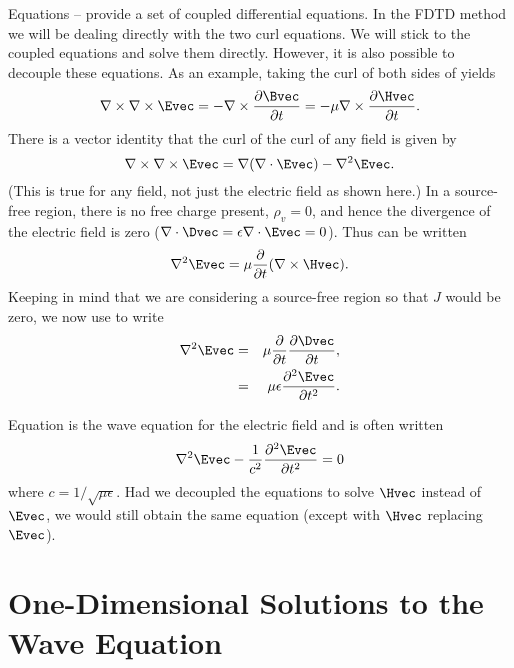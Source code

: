 Equations -- provide a set of
coupled differential equations.  In the FDTD method we will be dealing
directly with the two curl equations.  We will stick to the coupled
equations and solve them directly.  However, it is also possible to
decouple these equations.  As an example, taking the curl of both
sides of 
 yields
\begin{equation}
  \nabla \times  \nabla \times \Evec =
 -\nabla \times \frac{\partial\Bvec}{\partial t} =
 -\mu \nabla \times \frac{\partial\Hvec}{\partial t}.
  \label{eq:gettingWaveEq}
\end{equation}
There is a vector identity that the curl of the curl of any field is
given by
\begin{equation}
  \nabla \times \nabla \times \Evec =
  \nabla(\nabla\cdot\Evec) - \nabla^2 \Evec.
\end{equation}
(This is true for any field, not just the electric field as shown
here.)  In a source-free region, there is no free charge present,
$\rho_v=0$, and hence the divergence of the electric field
is zero ($\nabla\cdot\Dvec = \epsilon\nabla\cdot\Evec = 0$).
Thus  can be written
\begin{equation}
  \nabla^2 \Evec =
  \mu \frac{\partial}{\partial t} (\nabla \times \Hvec) .
\end{equation}
Keeping in mind that we are considering a source-free region so that
$J$ would be zero, we now use  to write
\begin{eqnarray}
  \nabla^2 \Evec &=&
  \mu \frac{\partial}{\partial t} \frac{\partial\Dvec}{\partial t}, \\
  &=&
  \mu\epsilon \frac{\partial^2\Evec}{\partial t^2}. \label{eq:waveEqE}
\end{eqnarray}

Equation  is the wave equation for the electric
field and is often written
\begin{eqnarray}
  \nabla^2 \Evec - \frac{1}{c^2} \frac{\partial^2\Evec}{\partial t^2}
  = 0
\end{eqnarray}
where $c=1/\sqrt{\mu\epsilon}$.  Had we decoupled the equations to
solve $\Hvec$ instead of $\Evec$, we would still obtain the same
equation (except with $\Hvec$ replacing $\Evec$).



\section{One-Dimensional Solutions to the Wave Equation
\label{sec:waveEq}} 

